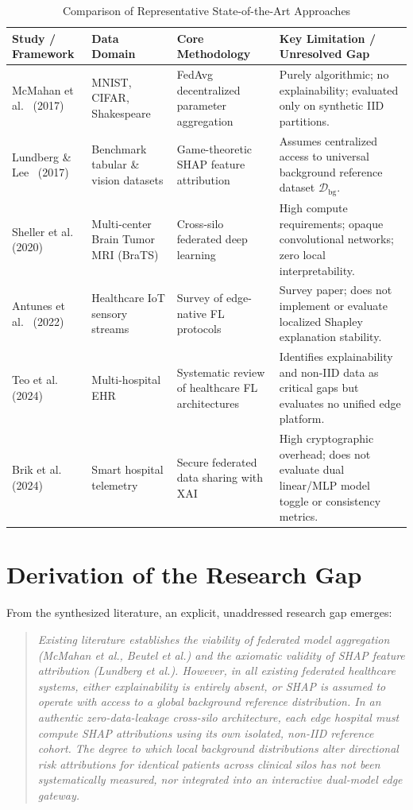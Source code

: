 \documentclass[12pt,a4paper,oneside]{report}
\begin{document}
\begin{table}[H]
\centering
\small
\caption{Comparison of Representative State-of-the-Art Approaches}
\label{tab:lit_comparison}
\begin{tabularx}{\textwidth}{p{3.2cm} p{2.8cm} p{3.2cm} X}
\toprule
\textbf{Study / Framework} & \textbf{Data Domain} & \textbf{Core Methodology} & \textbf{Key Limitation / Unresolved Gap} \\
\midrule
McMahan et al.~\cite{mcmahan2017communication} (2017) & MNIST, CIFAR, Shakespeare & FedAvg decentralized parameter aggregation & Purely algorithmic; no explainability; evaluated only on synthetic IID partitions. \\
Lundberg \& Lee~\cite{lundberg2017unified} (2017) & Benchmark tabular \& vision datasets & Game-theoretic SHAP feature attribution & Assumes centralized access to universal background reference dataset $\mathcal{D}_{\text{bg}}$. \\
Sheller et al.~\cite{sheller2020federated} (2020) & Multi-center Brain Tumor MRI (BraTS) & Cross-silo federated deep learning & High compute requirements; opaque convolutional networks; zero local interpretability. \\
Antunes et al.~\cite{antunes2022federated} (2022) & Healthcare IoT sensory streams & Survey of edge-native FL protocols & Survey paper; does not implement or evaluate localized Shapley explanation stability. \\
Teo et al.~\cite{teo2024federated} (2024) & Multi-hospital EHR & Systematic review of healthcare FL architectures & Identifies explainability and non-IID data as critical gaps but evaluates no unified edge platform. \\
Brik et al.~\cite{brik2024secure} (2024) & Smart hospital telemetry & Secure federated data sharing with XAI & High cryptographic overhead; does not evaluate dual linear/MLP model toggle or consistency metrics. \\
\bottomrule
\end{tabularx}
\end{table}

\section{Derivation of the Research Gap}
From the synthesized literature, an explicit, unaddressed research gap emerges:
\begin{quote}
\textit{Existing literature establishes the viability of federated model aggregation (McMahan et al., Beutel et al.) and the axiomatic validity of SHAP feature attribution (Lundberg et al.). However, in all existing federated healthcare systems, either explainability is entirely absent, or SHAP is assumed to operate with access to a global background reference distribution. In an authentic zero-data-leakage cross-silo architecture, each edge hospital must compute SHAP attributions using its own isolated, non-IID reference cohort. The degree to which local background distributions alter directional risk attributions for identical patients across clinical silos has not been systematically measured, nor integrated into an interactive dual-model edge gateway.}
\end{quote}
\end{document}

